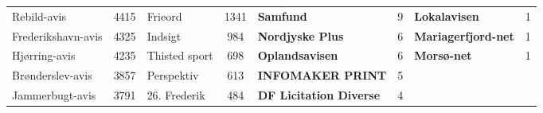 \begin{table}[h]
\begin{tabular}{l|c|l|c|l|c|l|c}
		Rebild-avis         &  4415  & Frieord         &  1341  & \textbf{Samfund}               &   9    & \textbf{Lokalavisen}        &   1    \\
		Frederikshavn-avis  &  4325  & Indsigt         &  984   & \textbf{Nordjyske Plus}        &   6    & \textbf{Mariagerfjord-net}  &   1    \\
		Hjørring-avis       &  4235  & Thisted sport   &  698   & \textbf{Oplandsavisen}         &   6    & \textbf{Morsø-net}          &   1    \\
		Brønderslev-avis    &  3857  & Perspektiv      &  613   & \textbf{INFOMAKER PRINT}       &   5    &                             &        \\
		Jammerbugt-avis     &  3791  & 26. Frederik    &  484   & \textbf{DF Licitation Diverse} &   4    &                             &        \\
		\bottomrule
	\end{tabular}
\end{table}
